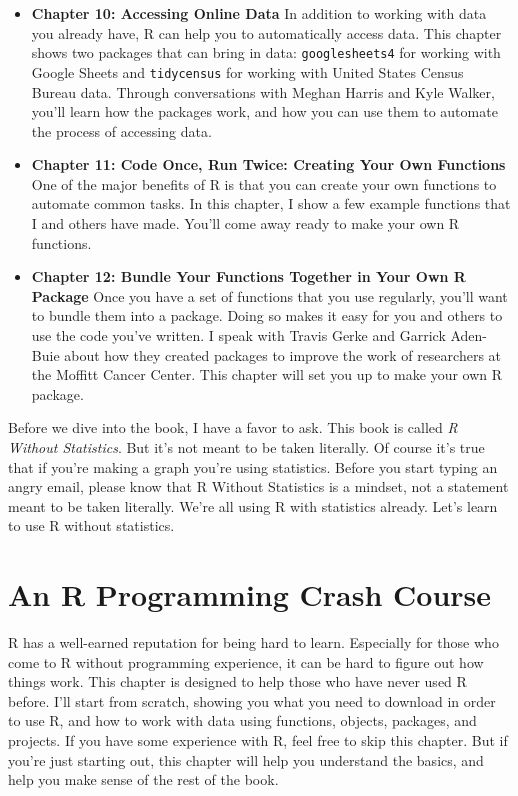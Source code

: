 \documentclass[
]{book}
\providecommand{\tightlist}{%
  \setlength{\itemsep}{0pt}\setlength{\parskip}{0pt}}
\begin{document}
\begin{itemize}
\tightlist
\item
  \textbf{Chapter 10: Accessing Online Data} In addition to working with data you already have, R can help you to automatically access data. This chapter shows two packages that can bring in data: \texttt{googlesheets4} for working with Google Sheets and \texttt{tidycensus} for working with United States Census Bureau data. Through conversations with Meghan Harris and Kyle Walker, you'll learn how the packages work, and how you can use them to automate the process of accessing data.
\item
  \textbf{Chapter 11: Code Once, Run Twice: Creating Your Own Functions} One of the major benefits of R is that you can create your own functions to automate common tasks. In this chapter, I show a few example functions that I and others have made. You'll come away ready to make your own R functions.
\item
  \textbf{Chapter 12: Bundle Your Functions Together in Your Own R Package} Once you have a set of functions that you use regularly, you'll want to bundle them into a package. Doing so makes it easy for you and others to use the code you've written. I speak with Travis Gerke and Garrick Aden-Buie about how they created packages to improve the work of researchers at the Moffitt Cancer Center. This chapter will set you up to make your own R package.
\end{itemize}

Before we dive into the book, I have a favor to ask. This book is called \emph{R Without Statistics}. But it's not meant to be taken literally. Of course it's true that if you're making a graph you're using statistics. Before you start typing an angry email, please know that R Without Statistics is a mindset, not a statement meant to be taken literally. We're all using R with statistics already. Let's learn to use R without statistics.

\hypertarget{howto-chapter}{%
\chapter{An R Programming Crash Course}\label{howto-chapter}}

R has a well-earned reputation for being hard to learn. Especially for those who come to R without programming experience, it can be hard to figure out how things work. This chapter is designed to help those who have never used R before. I'll start from scratch, showing you what you need to download in order to use R, and how to work with data using functions, objects, packages, and projects. If you have some experience with R, feel free to skip this chapter. But if you're just starting out, this chapter will help you understand the basics, and help you make sense of the rest of the book.
\end{document}

